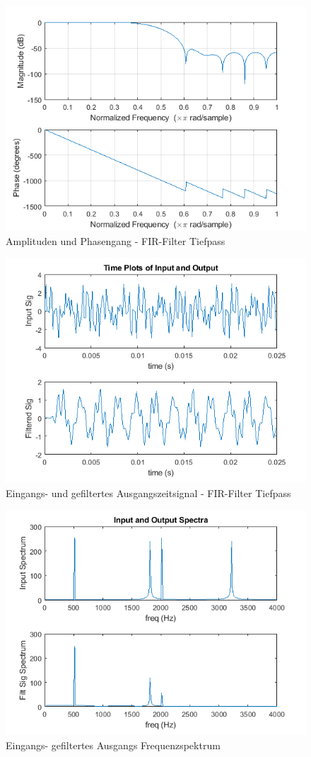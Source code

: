 \begin{figure}[h]
\centering
\includegraphics[width=0.8\linewidth]{Bilder/Attachment_A1_fir_2a_Amplitudengang}
\caption{Amplituden und Phasengang - FIR-Filter Tiefpass}
\label{fig:Attachment_A1_fir_2a_Amplitudengang}
\end{figure}

\newpage

\begin{figure}[h]
\centering
\includegraphics[width=0.6\linewidth]{Bilder/Attachment_A1_fir_2a_Timeplot}
\caption{Eingangs- und gefiltertes Ausgangszeitsignal  - FIR-Filter Tiefpass}
\label{fig:Attachment_A1_fir_2a_Timeplot}
\vspace{-10pt}
\end{figure}

\begin{figure}[h]
\centering
\includegraphics[width=0.6\linewidth]{Bilder/Attachment_A1_fir_2a_Spektrum}
\caption{Eingangs- gefiltertes Ausgangs Frequenzspektrum}
\label{fig:Attachment_A1_fir_2a_Spektrum}
\end{figure}

